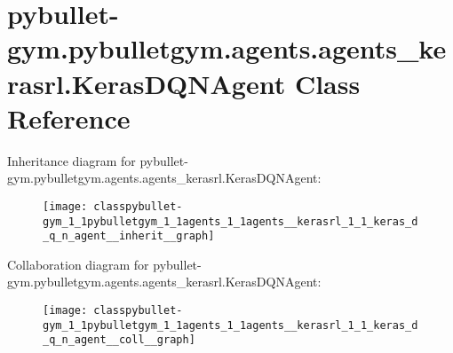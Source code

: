 \hypertarget{classpybullet-gym_1_1pybulletgym_1_1agents_1_1agents__kerasrl_1_1_keras_d_q_n_agent}{}\section{pybullet-\/gym.pybulletgym.\+agents.\+agents\+\_\+kerasrl.\+Keras\+D\+Q\+N\+Agent Class Reference}
\label{classpybullet-gym_1_1pybulletgym_1_1agents_1_1agents__kerasrl_1_1_keras_d_q_n_agent}


Inheritance diagram for pybullet-\/gym.pybulletgym.\+agents.\+agents\+\_\+kerasrl.\+Keras\+D\+Q\+N\+Agent\+:
\nopagebreak
\begin{figure}[H]
\begin{center}
\leavevmode
\texttt{[image: classpybullet-gym\_1\_1pybulletgym\_1\_1agents\_1\_1agents\_\_kerasrl\_1\_1\_keras\_d\_q\_n\_agent\_\_inherit\_\_graph]}
\end{center}
\end{figure}


Collaboration diagram for pybullet-\/gym.pybulletgym.\+agents.\+agents\+\_\+kerasrl.\+Keras\+D\+Q\+N\+Agent\+:
\nopagebreak
\begin{figure}[H]
\begin{center}
\leavevmode
\texttt{[image: classpybullet-gym\_1\_1pybulletgym\_1\_1agents\_1\_1agents\_\_kerasrl\_1\_1\_keras\_d\_q\_n\_agent\_\_coll\_\_graph]}
\end{center}
\end{figure}
